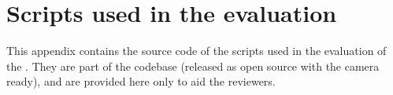 \documentclass[sigplan,10pt,review,anonymous]{acmart}
\begin{document}



\appendix
\section{Scripts used in the evaluation}

This appendix contains the source code of the scripts used in the evaluation of
the \sys. They are part of the codebase (released as open source with the camera
ready), and are provided here only to aid the reviewers.
\end{document}

